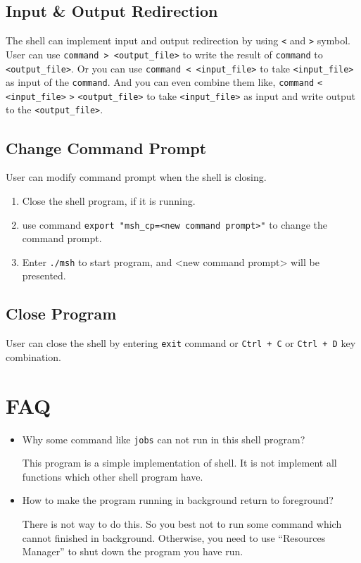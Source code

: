 \documentclass{article}
\begin{document}
\subsection{Input \& Output Redirection}

The shell can implement input and output redirection by using \verb|<| and \verb|>| symbol.
User can use \verb|command > <output_file>| to write the result of \verb|command| to \verb|<output_file>|.
Or you can use \verb|command < <input_file>| to take \verb|<input_file>| as input of the \verb|command|.
And you can even combine them like, \verb|command| \verb|<| \verb|<input_file>| \verb|>| \verb|<output_file>| to take \verb|<input_file>| as input and write output to the \verb|<output_file>|.

\subsection{Change Command Prompt}

User can modify command prompt when the shell is closing.

\begin{enumerate}
\item Close the shell program, if it is running.
\item use command \verb|export "msh_cp=<new command prompt>"| to change the command prompt.
\item Enter \verb|./msh| to start program, and <new command prompt> will be presented.
\end{enumerate}

\subsection{Close Program}

User can close the shell by entering \verb|exit| command or \verb|Ctrl + C| or \verb|Ctrl + D| key combination.

\section{FAQ}

\begin{itemize}
\item Why some command like \verb|jobs| can not run in this shell program?

This program is a simple implementation of shell.
It is not implement all functions which other shell program have.

\item How to make the program running in background return to foreground?

There is not way to do this.
So you best not to run some command which cannot finished in background.
Otherwise, you need to use ``Resources Manager'' to shut down the program you have run.

\end{itemize}
\end{document}
